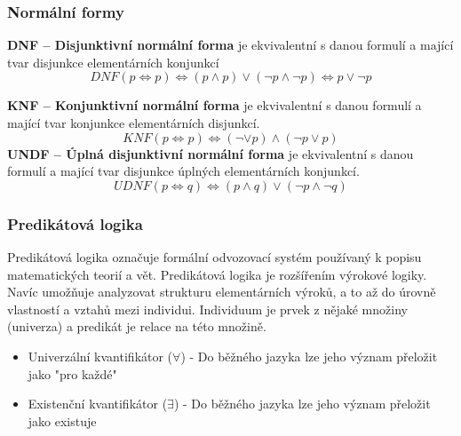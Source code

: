 \subsubsection{Normální formy}
\textbf{DNF -- Disjunktivní normální forma} je ekvivalentní s danou formulí a mající tvar disjunkce elementárních konjunkcí
\begin{equation*}
	DNF(p \iff p)\iff (p \wedge p) \vee (\neg p \wedge \neg p) \iff p \vee \neg p
\end{equation*}

\textbf{KNF -- Konjunktivní normální forma} je ekvivalentní s danou formulí a mající tvar konjunkce elementárních disjunkcí.
\begin{equation*}
	KNF(p \iff p)\iff (\neg \vee p) \wedge (\neg p \vee p)
\end{equation*}
\textbf{UNDF -- Úplná disjunktivní normální forma} je ekvivalentní s danou formulí a mající tvar disjunkce úplných elementárních konjunkcí.
\begin{equation*}
	UDNF(p \iff q)\iff (p \wedge q) \vee (\neg p \wedge \neg q)
\end{equation*}

\subsubsection{Predikátová logika}
Predikátová logika označuje formální odvozovací systém používaný k popisu matematických teorií a vět.
Predikátová logika je rozšířením výrokové logiky. Navíc umožňuje analyzovat strukturu elementárních výroků, a to až do úrovně vlastností a vztahů mezi individui. Individuum je prvek z nějaké množiny (univerza) a predikát je relace na této množině.
\begin{itemize}
\item Univerzální kvantifikátor ($\forall$) - Do běžného jazyka lze jeho význam přeložit jako "pro každé"
\item Existenční kvantifikátor ($\exists$) - Do běžného jazyka lze jeho význam přeložit jako existuje
\end{itemize}

